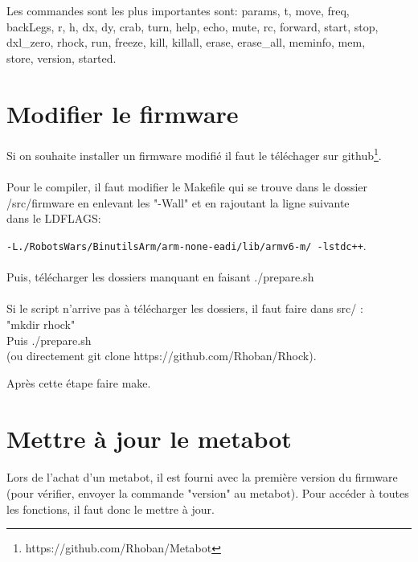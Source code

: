 \documentclass[10pt,a4paper]{report}
\begin{document}
Les commandes sont les plus importantes sont: params,  t, move, freq, \\backLegs, r, h, dx, dy, crab, turn, help, echo, mute, rc, forward, start, stop,\\ dxl\_zero, rhock, run, freeze, kill, killall, erase, erase\_all, meminfo, mem, \\store, version, started.

\section{Modifier le firmware}
\paragraph{}

Si on souhaite installer un firmware modifié il faut le téléchager sur github\footnote{https://github.com/Rhoban/Metabot}.
\paragraph{}
Pour le compiler, il faut modifier le Makefile qui se trouve dans le dossier\\ /src/firmware en enlevant les "-Wall" et en rajoutant la ligne suivante \\dans le LDFLAGS:

\texttt{-L./RobotsWars/BinutilsArm/arm-none-eadi/lib/armv6-m/ -lstdc++}.


\paragraph{}
Puis, télécharger les dossiers manquant en faisant ./prepare.sh
\paragraph{}
Si le script n'arrive pas à télécharger les dossiers, il faut faire dans src/ :\\
"mkdir rhock"  \\
Puis ./prepare.sh \\
(ou directement git clone https://github.com/Rhoban/Rhock).

Après cette étape faire make.

\section{Mettre à jour le metabot}
\paragraph{}
Lors de l'achat d'un metabot, il est fourni avec la première version du firmware (pour vérifier, envoyer la commande "version" au metabot). Pour accéder à toutes les fonctions, il faut donc le mettre à jour.
\end{document}
